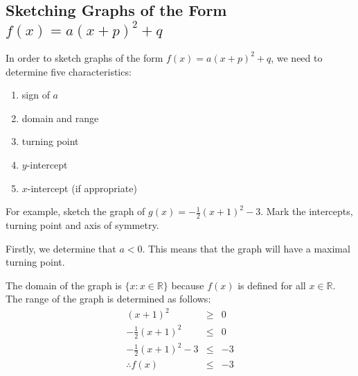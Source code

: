 
\subsection{Sketching Graphs of the Form $f(x)=a(x+p)^2+q$}
In order to sketch graphs of the form $f(x)=a(x+p)^2+q$, we need to determine five characteristics:
\begin{enumerate}
\item{sign of $a$}
\item{domain and range}
\item{turning point}
\item{$y$-intercept}
\item{$x$-intercept (if appropriate)}
\end{enumerate}

For example, sketch the graph of $g(x)=-\frac{1}{2}(x+1)^2-3$. Mark the intercepts, turning point and axis of symmetry.

Firstly, we determine that $a<0$. This means that the graph will have a maximal turning point.

The domain of the graph is $\{x:x\in\mathbb{R}\}$ because $f(x)$ is defined for all $x\in \mathbb{R}$. The range of the graph is determined as follows:
\begin{eqnarray*}
(x+1)^2 &\ge& 0\\
-\frac{1}{2}(x+1)^2 &\le& 0\\
-\frac{1}{2}(x+1)^2-3 &\le& -3\\
\therefore f(x) &\le& -3
\end{eqnarray*}

